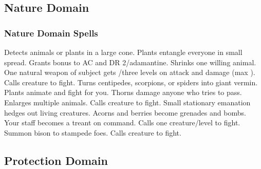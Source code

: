 \subsection{Nature Domain}

\subsubsection{Nature Domain Spells}
\begin{spelllist}
 Detects animals or plants in a large cone.
 Plants entangle everyone in small spread.
 Grants  bonus to AC and DR 2/adamantine.
 Shrinks one willing animal.
 One natural weapon of subject gets /three levels on attack and damage (max ).
 Calls creature to fight.
 Turns centipedes, scorpions, or spiders into giant vermin.
\spellhead[4]{}
 Plants animate and fight for you.
 Thorns damage anyone who tries to pass.
 Enlarges multiple animals.
 Calls creature to fight.
 Small stationary emanation hedges out living creatures.
 Acorns and berries become grenades and bombs.
 Your staff becomes a treant on command.
 Calls one creature/level to fight.
 Summon bison to stampede foes.
 Calls creature to fight.
\end{spelllist}

\subsection{Protection Domain}
